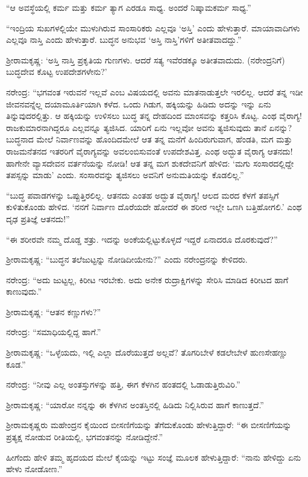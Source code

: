 “ಆ ಅವಸ್ಥೆಯಲ್ಲಿ ಕರ್ಮ ಮತ್ತು ಕರ್ಮ ತ್ಯಾಗ ಎರಡೂ ಸಾಧ್ಯ. ಅಂದರೆ ನಿಷ್ಕಾಮಕರ್ಮ ಸಾಧ್ಯ.”

“ಇಂದ್ರಿಯ ಸುಖಗಳಲ್ಲಿಯೇ ಮುಳುಗಿರುವ ಸಾಂಸಾರಿಕರು ಎಲ್ಲವೂ ‘ಅಸ್ತಿ’ ಎಂದು ಹೇಳುತ್ತಾರೆ. ಮಾಯಾವಾದಿಗಳು ಎಲ್ಲವೂ ನಾಸ್ತಿ ಎಂದು ಹೇಳುತ್ತಾರೆ. ಬುದ್ಧನ ಅನುಭವ ‘ಅಸ್ತಿ ನಾಸ್ತಿ’ಗಳಿಗೆ ಅತೀತವಾದದ್ದು.”

ಶ‍್ರೀರಾಮಕೃಷ್ಣ: ‘ಅಸ್ತಿ ನಾಸ್ತಿ ಪ್ರಕೃತಿಯ ಗುಣಗಳು. ಆದರೆ ಸತ್ಯ ಇವೆರಡಕ್ಕೂ ಅತೀತವಾದುದು. (ನರೇಂದ್ರನಿಗೆ) ಬುದ್ಧದೇವ ಕೊಟ್ಟ ಉಪದೇಶಗಳೇನು?’

ನರೇಂದ್ರ: “ಭಗವಂತ ಇರುವನೆ ಇಲ್ಲವೆ ಎಂಬ ವಿಷಯದಲ್ಲಿ ಅವನು ಮಾತನಾಡುತ್ತಲೇ ಇರಲಿಲ್ಲ. ಆದರೆ ತನ್ನ ಇಡೀ ಜೀವನವನ್ನೆಲ್ಲ ದಯಾಮೂರ್ತಿಯಾಗಿ ಕಳೆದ. ಒಂದು ಗಿಡುಗ, ಹಕ್ಕಿಯನ್ನು ಹಿಡಿದು ಅದನ್ನು ಇನ್ನು ಏನು ತಿನ್ನುವುದರಲ್ಲಿತ್ತು. ಆ ಹಕ್ಕಿಯನ್ನು ಉಳಿಸಲು ಬುದ್ಧ ತನ್ನ ದೇಹದಿಂದ ಮಾಂಸವನ್ನು ಕತ್ತರಿಸಿ ಕೊಟ್ಟ. ಎಂಥ ವೈರಾಗ್ಯ! ರಾಜಕುಮಾರನಾಗಿದ್ದರೂ ಎಲ್ಲವನ್ನೂ ತ್ಯಜಿಸಿದ. ಯಾರಿಗೆ ಏನು ಇಲ್ಲವೋ ಅವನು ತ್ಯಜಿಸುವುದು ತಾನೆ ಏನನ್ನು? ಬುದ್ಧನಾದ ಮೇಲೆ ನಿರ್ವಾಣವನ್ನು ಹೊಂದಿದಮೇಲೆ ಆತ ತನ್ನ ಮನೆಗೆ ಹಿಂದಿರುಗುವಾಗ, ಹೆಂಡತಿ, ಮಗ ಮತ್ತು ರಾಜಮನೆತನದ ಇತರರಿಗೆ ವೈರಾಗ್ಯವನ್ನು ಅವಲಂಬಿಸುವಂತೆ ಉಪದೇಶವಿತ್ತ. ಎಂಥ ಅದ್ಭುತ ವೈರಾಗ್ಯ ಆತನದು! ಹಾಗೇನೇ ವ್ಯಾಸದೇವನ ವರ್ತನೆಯನ್ನು ನೋಡಿ! ಆತ ತನ್ನ ಮಗ ಶುಕದೇವನಿಗೆ ಹೇಳಿದ: ‘ಮಗು ಸಂಸಾರದಲ್ಲಿದ್ದೇ ತಪಸ್ಸನ್ನು ಮಾಡು’ ಎಂದು. ಸಂಸಾರವನ್ನು ತ್ಯಜಿಸಲು ಅವನಿಗೆ ಅನುಮತಿಯನ್ನು ಕೊಡಲಿಲ್ಲ.”

“ಬುದ್ಧ ಪವಾಡಗಳನ್ನು ಒಪ್ಪುತ್ತಿರಲಿಲ್ಲ. ಆತನದು ಎಂತಹ ಅದ್ಭುತ ವೈರಾಗ್ಯ! ಆಲದ ಮರದ ಕೆಳಗೆ ತಪಸ್ಸಿಗೆ ಕುಳಿತುಕೊಂಡು ಹೇಳಿದ. ‘ನನಗೆ ನಿರ್ವಾಣ ದೊರೆಯದೇ ಹೋದರೆ ಈ ಶರೀರ ಇಲ್ಲೇ ಒಣಗಿ ಬತ್ತಿಹೋಗಲಿ.’ ಎಂಥ ದೃಢ ಪ್ರತಿಜ್ಞೆ ಆತನದು!”

“ಈ ಶರೀರವೇ ನಮ್ಮ ದೊಡ್ಡ ಶತ್ರು. ಇದನ್ನು ಅಂಕೆಯಲ್ಲಿಟ್ಟುಕೊಳ್ಳದೆ ಇದ್ದರೆ ಏನಾದರೂ ದೊರಕುವುದೆ?”

ಶ‍್ರೀರಾಮಕೃಷ್ಣ: “ಬುದ್ಧನ ತಲೆಜುಟ್ಟನ್ನು ನೋಡಿದೀಯೇನು?” ಎಂದು ನರೇಂದ್ರನನ್ನು ಕೇಳಿದರು.

ನರೇಂದ್ರ: “ಅದು ಜುಟ್ಟಲ್ಲ, ಕಿರೀಟ ಇರಬೇಕು. ಅದು ಅನೇಕ ರುದ್ರಾಕ್ಷಿಗಳನ್ನು ಸೇರಿಸಿ ಮಾಡಿದ ಕಿರೀಟದ ಹಾಗೆ ಕಾಣುವುದು.”

ಶ‍್ರೀರಾಮಕೃಷ್ಣ: “ಆತನ ಕಣ್ಣುಗಳು?”

ನರೇಂದ್ರ: “ಸಮಾಧಿಯಲ್ಲಿದ್ದ ಹಾಗೆ.”

ಶ‍್ರೀರಾಮಕೃಷ್ಣ: “ಒಳ್ಳೆಯದು, ಇಲ್ಲಿ ಎಲ್ಲಾ ದೊರೆಯುತ್ತದೆ ಅಲ್ಲವೆ? ತೊಗರಿಬೇಳೆ ಕಡಲೇಬೇಳೆ ಹುಣಸೇಹಣ್ಣು ಕೂಡ.”

ನರೇಂದ್ರ: “ನೀವು ಎಲ್ಲ ಅಂತಸ್ತುಗಳನ್ನು ಹತ್ತಿ, ಈಗ ಕೆಳಗಿನ ಹಂತದಲ್ಲಿ ಓಡಾಡುತ್ತಿರುವಿರಿ.”

ಶ‍್ರೀರಾಮಕೃಷ್ಣ: “ಯಾರೋ ನನ್ನನ್ನು ಈ ಕೆಳಗಿನ ಅಂತಸ್ತಿನಲ್ಲಿ ಹಿಡಿದು ನಿಲ್ಲಿಸಿರುವ ಹಾಗೆ ಕಾಣುತ್ತದೆ.”

ಶ‍್ರೀರಾಮಕೃಷ್ಣರು ಮಹೇಂದ್ರನ ಕೈಯಿಂದ ಬೀಸಣಿಗೆಯನ್ನು ತೆಗೆದುಕೊಂಡು ಹೇಳುತ್ತಿದ್ದಾರೆ: “ಈ ಬೀಸಣಿಗೆಯನ್ನು ಪ್ರತ್ಯಕ್ಷ ನೋಡುವ ರೀತಿಯಲ್ಲಿ, ಭಗವಂತನನ್ನು ನೋಡಿದ್ದೇನೆ.”

ಹೀಗೆಂದು ಹೇಳಿ ತಮ್ಮ ಹೃದಯದ ಮೇಲೆ ಕೈಯನ್ನು ಇಟ್ಟು ಸಂಜ್ಞೆ ಮೂಲಕ ಹೇಳುತ್ತಿದ್ದಾರೆ: “ನಾನು ಹೇಳಿದ್ದು ಏನು ಹೇಳು ನೋಡೋಣ.”

